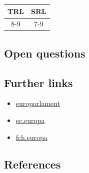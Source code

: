 \documentclass[
]{book}
\providecommand{\tightlist}{%
  \setlength{\itemsep}{0pt}\setlength{\parskip}{0pt}}
\begin{document}
\begin{longtable}[]{@{}cc@{}}
\toprule
TRL & SRL\tabularnewline
\midrule
\endhead
8-9 & 7-9\tabularnewline
\bottomrule
\end{longtable}

\hypertarget{open-questions-14}{%
\subsection*{Open questions}\label{open-questions-14}}

\hypertarget{further-links-10}{%
\subsection*{Further links}\label{further-links-10}}

\begin{itemize}
\tightlist
\item
  \href{https://www.europarl.europa.eu/news/nl/press-room/20180911IPR13114/more-electric-cars-on-eu-roads-by-2030}{europarlament}
\item
  \href{https://ec.europa.eu/transport/themes/urban/vehicles/road/hydrogen_en}{ec.europa}
\item
  \href{https://www.fch.europa.eu/news/hydrogen-roadmap-europe-sustainable-pathway-european-energy-transition}{fch.europa}
\end{itemize}

\hypertarget{references-14}{%
\subsection*{References}\label{references-14}}
\end{document}
